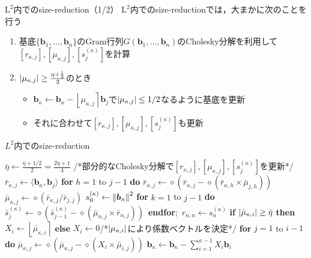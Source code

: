 \documentclass[12pt,aspectratio=169,xcolor=dvipsnames,table,dvipdfmx, leqno]{beamer}
\renewcommand{\Comment}[1]{\quad/*#1*/}
\newcommand{\round}[1]{\left\lfloor #1 \right\rceil}
\begin{document}
\begin{frame}{$\text{L}^2$内でのsize-reduction（1/2）}
$\text{L}^2$内でのsize-reductionでは，大まかに次のことを行う
\begin{enumerate}
    \item 基底$\{\bm{b}_1,\ldots,\bm{b}_n\}$のGram行列$G(\bm{b}_1,\ldots,\bm{b}_n)$のCholesky分解を利用して$[r_{\kappa, j}], [\mu_{\kappa, j}], [s_j^{(\kappa)}]$を計算
    \item $\abs{\mu_{\kappa, j}}\ge \frac{\eta+\frac{1}{2}}{2}$のとき
    \begin{itemize}
        \item $\bm{b}_\kappa\gets \bm{b}_\kappa-\round{\mu_{\kappa, j}}\bm{b}_j$で$\abs{\mu_{\kappa, j}}\le 1/2$なるように基底を更新
        \item それに合わせて$[r_{\kappa, j}], [\mu_{\kappa, j}], [s_j^{(\kappa)}]$も更新
    \end{itemize}
\end{enumerate}
\end{frame}

\begin{frame}{}
\begin{algorithm}[H]
    \footnotesize
    \begin{algorithmic}[1]
        \caption{\footnotesize $L^2$内でのsize-reduction}
        \label{alg_size_L2}
        \State $\bar{\eta}\gets\frac{\eta+1/2}{2}=\frac{2\eta+1}{4}$
        \Do
            \Comment{部分的なCholesky分解で$[r_{\kappa, j}], [\mu_{\kappa, j}], [s_{j}^{(\kappa)}]$を更新}
                \State $\bar{r}_{\kappa, j}\gets \langle\bm{b}_\kappa, \bm{b}_j\rangle$
                \State \textbf{for} $h=1$ to $j-1$ \textbf{do} $\bar{r}_{\kappa, j}\gets \diamond(\bar{r}_{\kappa, j}-\diamond(\bar{r}_{\kappa, h}\times\bar{\mu}_{j, h}))$
                \State $\bar{\mu}_{\kappa, j}\gets \diamond(\bar{r}_{\kappa, j}/\bar{r}_{j, j})$
            \EndFor
            \State $s_0^{(\kappa)}\gets \norm{\bm{b}_n}^2$
            \State \textbf{for} $k = 1$ to $j-1$ \textbf{do} $\bar{s}_j^{(\kappa)}\gets \diamond(\bar{s}_{j-1}^{(\kappa)}-\diamond(\bar{\mu}_{n, j}\times\bar{r}_{n, j}))$~\textbf{endfor};~$r_{n, n}\gets s_n^{(\kappa)}$
                \State \textbf{if} $\abs{\bar{\mu}_{\kappa, i}}\ge \bar{\eta}$ \textbf{then} $X_i\gets \round{\bar{\mu}_{\kappa, i}}$ \textbf{else} $X_i\gets 0$\Comment{$\abs{\mu_{\kappa, i}}$により係数ベクトルを決定}
                \State \textbf{for} $j=1$ to $i-1$ \textbf{do} $\bar{\mu}_{\kappa, j}\gets \diamond(\bar{\mu}_{\kappa, j}-\diamond(X_i\times\bar{\mu}_{i, j}))$
            \EndFor
            \State $\bm{b}_\kappa\gets \bm{b}_\kappa-\sum_{i=1}^{\kappa-1}X_i\bm{b}_i$
    \end{algorithmic}
\end{algorithm}
\end{frame}
\end{document}

